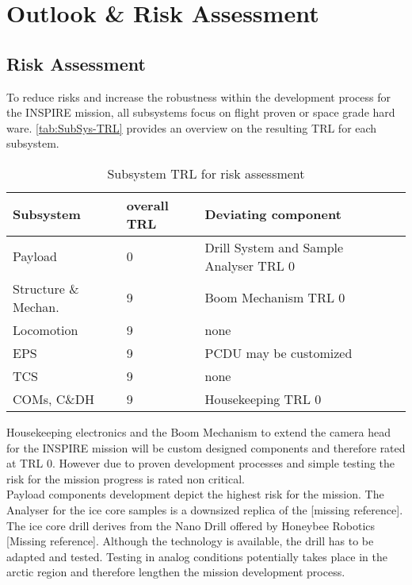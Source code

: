 \chapter{Outlook \& Risk Assessment}
\label{chap:outlook}

\section{Risk Assessment}
\label{sec:RiskAssessment}

To reduce risks and increase the robustness within the development process for the INSPIRE mission, all subsystems focus on flight proven or space grade hard ware. \autoref{tab:SubSys-TRL} provides an overview on the resulting TRL for each subsystem. 
 
\begin{table}[h]
\centering
\begin{tabular}{llll}
\toprule
Subsystem            & overall TRL & Deviating component      &  \\
\midrule
Payload              & 0           & Drill System and Sample Analyser TRL 0 &  \\
Structure \& Mechan. & 9           & Boom Mechanism TRL 0     &  \\
Locomotion           & 9           & none                     &  \\
EPS                  & 9           & PCDU may be customized                     &  \\
TCS                  & 9           & none                     &  \\
COMs, C\&DH          & 9           & Housekeeping TRL 0       & 	 \\
\bottomrule
\end{tabular}
\caption{Subsystem TRL for risk assessment}
\label{tab:SubSys-TRL}
\end{table}

Housekeeping electronics and the Boom Mechanism to extend the camera head for the INSPIRE mission will be custom designed components and therefore rated at TRL 0. However due to proven development processes and simple testing the risk for the mission progress is rated non critical.  \\

Payload components development depict the highest risk for the mission. The Analyser for the ice core samples is a downsized replica of the [missing reference]. 
The ice core drill derives from the Nano Drill offered by Honeybee Robotics [Missing reference]. Although the technology is available, the drill has to be adapted and tested. Testing in analog conditions potentially takes place in the arctic region and therefore lengthen the mission development process. \\

